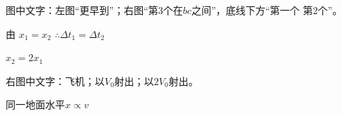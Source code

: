 图中文字：左图“更早到”；右图“第3个在$bc$之间”，底线下方“第一个 第2个”。
\begin{minipage}[t]{0.47\linewidth}
由 $x_1=x_2$ $\therefore\Delta t_1=\Delta t_2$
\end{minipage}\hfill
\begin{minipage}[t]{0.50\linewidth}
$x_2=2x_1$
\end{minipage}

右图中文字：飞机；以$V_0$射出；以$2V_0$射出。

同一地面\quad 水平\quad $x\propto v$

